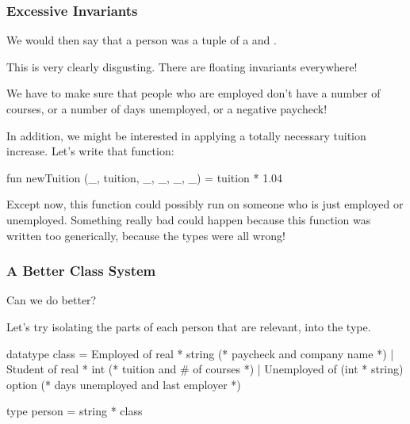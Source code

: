 \documentclass[aspectratio=169]{beamer}
\begin{document}
\begin{frame}[fragile]
  \frametitle{Excessive Invariants}

  We would then say that a person was a tuple of a  and .

  \pause
  \vspace{\fill}

  This is very clearly disgusting. There are floating invariants everywhere!

  \pause
  \vspace{\fill}

  We have to make sure that people who are employed don't have a number of
  courses, or a number of days unemployed, or a negative paycheck!

  \pause
  \vspace{\fill}

  In addition, we might be interested in applying a totally necessary tuition
  increase. Let's write that function:

  \begin{codeblock}
    fun newTuition (_, tuition, _, _, _, _) = tuition * 1.04
  \end{codeblock}

  \pause
  \vspace{\fill}

  Except now, this function could possibly run on someone who is just
  employed or unemployed. Something really bad could happen because this
  function was written too generically, because the types were all wrong!
\end{frame}

\begin{frame}[fragile]
  \frametitle{A Better Class System}

  Can we do better?

  \pause
  \vspace{\fill}

  Let's try isolating the parts of each person that are relevant, into
  the  type.

  \pause
  \vspace{\fill}

  \begin{codeblock}
    datatype class =
        Employed of real * string
          (* paycheck and company name *)
      | Student of real * int
          (* tuition and # of courses *)
      | Unemployed of (int * string) option
          (* days unemployed and last employer *)

    type person = string * class
  \end{codeblock}
\end{frame}
\end{document}
